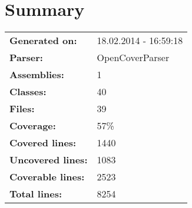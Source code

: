 \documentclass[a4paper,10pt]{article}
\begin{document}
\setcounter{secnumdepth}{-1}
\section{Summary}
\begin{longtable}[l]{ll}
\textbf{Generated on:} & 18.02.2014 - 16:59:18\\
\textbf{Parser:} & OpenCoverParser\\
\textbf{Assemblies:} & 1\\
\textbf{Classes:} & 40\\
\textbf{Files:} & 39\\
\textbf{Coverage:} & 57\%\\
\textbf{Covered lines:} & 1440\\
\textbf{Uncovered lines:} & 1083\\
\textbf{Coverable lines:} & 2523\\
\textbf{Total lines:} & 8254\\
\end{longtable}
\end{document}
